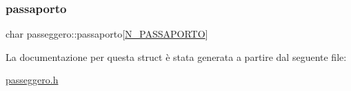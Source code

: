 \mbox{\label{structpasseggero_a528684369528c7278332209e8b022d69}} 
\subsubsection{\texorpdfstring{passaporto}{passaporto}}
{\footnotesize\ttfamily char passeggero\+::passaporto\mbox{[}\hyperlink{costanti_8h_aadeea3748411f923275f2744dbb26cd1}{N\+\_\+\+P\+A\+S\+S\+A\+P\+O\+R\+TO}\mbox{]}}



La documentazione per questa struct è stata generata a partire dal seguente file\+:\begin{DoxyCompactItemize}
\item 
\hyperlink{passeggero_8h}{passeggero.\+h}\end{DoxyCompactItemize}
